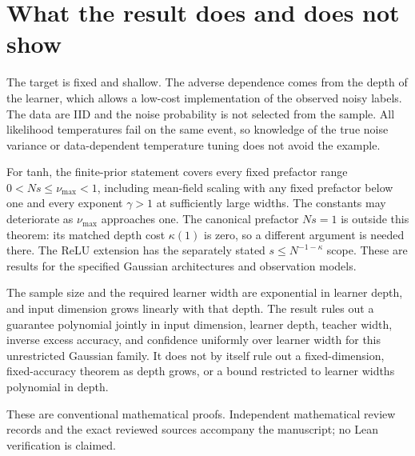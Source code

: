\section{What the result does and does not show}
The target is fixed and shallow. The adverse dependence comes from the depth of the learner, which allows a low-cost implementation of the observed noisy labels. The data are IID and the noise probability is not selected from the sample. All likelihood temperatures fail on the same event, so knowledge of the true noise variance or data-dependent temperature tuning does not avoid the example.

For tanh, the finite-prior statement covers every fixed prefactor range $0<Ns\le\nu_{\max}<1$, including mean-field scaling with any fixed prefactor below one and every exponent $\gamma>1$ at sufficiently large widths. The constants may deteriorate as $\nu_{\max}$ approaches one. The canonical prefactor $Ns=1$ is outside this theorem: its matched depth cost $\kappa(1)$ is zero, so a different argument is needed there. The ReLU extension has the separately stated $s\le N^{-1-\kappa}$ scope. These are results for the specified Gaussian architectures and observation models.

The sample size and the required learner width are exponential in learner depth, and input dimension grows linearly with that depth. The result rules out a guarantee polynomial jointly in input dimension, learner depth, teacher width, inverse excess accuracy, and confidence uniformly over learner width for this unrestricted Gaussian family. It does not by itself rule out a fixed-dimension, fixed-accuracy theorem as depth grows, or a bound restricted to learner widths polynomial in depth.

These are conventional mathematical proofs. Independent mathematical review records and the exact reviewed sources accompany the manuscript; no Lean verification is claimed.
